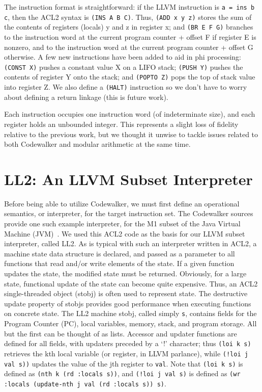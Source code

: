 \documentclass{eptcs}
\begin{document}
The instruction format is straightforward: if the LLVM instruction is 
\texttt{a = ins b c}, then the ACL2 syntax is \texttt{(INS A B C)}.  
Thus, \texttt{(ADD x y z)} stores the sum of the contents of registers 
(locals) y and z in register x; and  \texttt{(BR E F G)} branches to 
the instruction word at the current program counter + offset F 
if register E is nonzero, and to the instruction word at the 
current program counter + offset G otherwise.  A few new 
instructions have been added to aid in phi processing: \texttt{(CONST X)} 
pushes a constant value X on a LIFO stack; \texttt{(PUSH Y)} pushes 
the contents of register Y onto the stack; and \texttt{(POPTO Z)} pops 
the top of stack value into register Z.    We also define 
a \texttt{(HALT)} instruction so we don't have to worry 
about defining a return linkage (this is future work).

Each instruction occupies one instruction word (of indeterminate size), 
and each register holds an unbounded integer.  This represents a 
slight loss of fidelity relative to the previous work, but we 
thought it unwise to tackle issues related to both
Codewalker and modular arithmetic at the same time. 

\section{LL2: An LLVM Subset Interpreter}\label{interp}

Before being able to utilize Codewalker, we must first 
define an operational semantics, or interpreter, for the target instruction set.  
The Codewalker sources provide one such
example interpreter, for the M1 subset of the Java Virtual 
Machine (JVM)~\cite{JVMSpec}.  We used this ACL2 code as 
the basis for our LLVM subset interpreter, called LL2.  As is 
typical with such an interpreter written in ACL2, a machine state data
structure is declared, and passed as a parameter to all functions that
read and/or write elements of the state.  If a given function updates
the state, the modified state must be returned.  Obviously, for a large
state, functional update of the state can become quite expensive.  
Thus, an ACL2 single-threaded object (stobj) \cite{STOBJ} is often 
used to represent state.  The destructive update property of stobjs 
provides good performance when executing functions on 
concrete state.  The LL2 machine stobj, called simply \texttt{s}, 
contains fields for the Program Counter (PC), 
local variables, memory, stack, and program storage.  All but the
first can be thought of as lists.  Accessor and updater functions 
are defined for all fields, with updaters preceded by a `!' character; 
thus \texttt{(loi k s)} retrieves the kth local variable (or register,
in LLVM parlance), while \texttt{(!loi j val s))} updates the value of 
the jth register to \texttt{val}.  Note that \texttt{(loi k s)}
is defined as \texttt{(nth k (rd :locals s))}, and \texttt{(!loi j val
  s)} is defined as \texttt{(wr :locals (update-nth j val (rd :locals s)) s)}.
\end{document}
